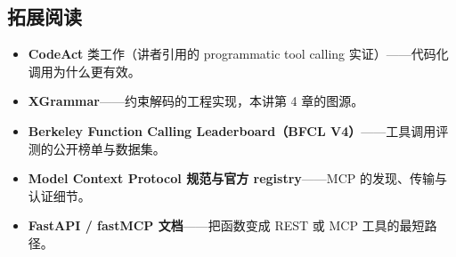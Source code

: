 \documentclass[a4paper]{article}
\begin{document}
\subsection{拓展阅读}
\begin{itemize}
\item \textbf{CodeAct} 类工作（讲者引用的 programmatic tool calling 实证）——代码化调用为什么更有效。
\item \textbf{XGrammar}——约束解码的工程实现，本讲第 4 章的图源。
\item \textbf{Berkeley Function Calling Leaderboard（BFCL V4）}——工具调用评测的公开榜单与数据集。
\item \textbf{Model Context Protocol 规范与官方 registry}——MCP 的发现、传输与认证细节。
\item \textbf{FastAPI / fastMCP 文档}——把函数变成 REST 或 MCP 工具的最短路径。
\end{itemize}

\end{document}
